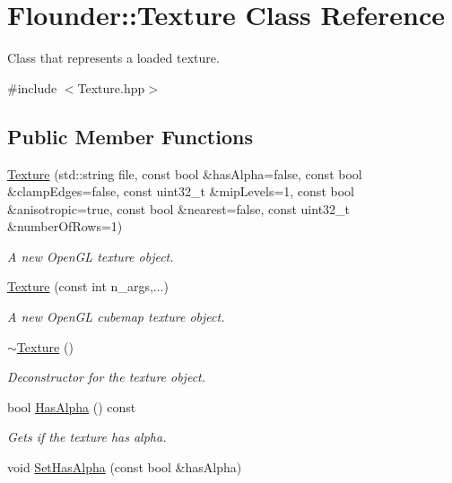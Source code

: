 \hypertarget{class_flounder_1_1_texture}{}\section{Flounder\+:\+:Texture Class Reference}
\label{class_flounder_1_1_texture}


Class that represents a loaded texture.  




{\ttfamily \#include $<$Texture.\+hpp$>$}

\subsection*{Public Member Functions}
\begin{DoxyCompactItemize}
\item 
\hyperlink{class_flounder_1_1_texture_ac60bc0a669aaa5fefc000c79e689faa9}{Texture} (std\+::string file, const bool \&has\+Alpha=false, const bool \&clamp\+Edges=false, const uint32\+\_\+t \&mip\+Levels=1, const bool \&anisotropic=true, const bool \&nearest=false, const uint32\+\_\+t \&number\+Of\+Rows=1)
\begin{DoxyCompactList}\small\item\em A new Open\+GL texture object. \end{DoxyCompactList}\item 
\hyperlink{class_flounder_1_1_texture_a5ae861da9c85957c8ec9732b049d47c4}{Texture} (const int n\+\_\+args,...)
\begin{DoxyCompactList}\small\item\em A new Open\+GL cubemap texture object. \end{DoxyCompactList}\item 
\hyperlink{class_flounder_1_1_texture_a9233b9e412d9eab52b36c9d3b932ca58}{$\sim$\+Texture} ()
\begin{DoxyCompactList}\small\item\em Deconstructor for the texture object. \end{DoxyCompactList}\item 
bool \hyperlink{class_flounder_1_1_texture_a35e67142ee392c430052ebd5e05cd725}{Has\+Alpha} () const
\begin{DoxyCompactList}\small\item\em Gets if the texture has alpha. \end{DoxyCompactList}\item 
void \hyperlink{class_flounder_1_1_texture_ad9821b14d55656438883826dd1767e4a}{Set\+Has\+Alpha} (const bool \&has\+Alpha)

\end{DoxyCompactItemize}
